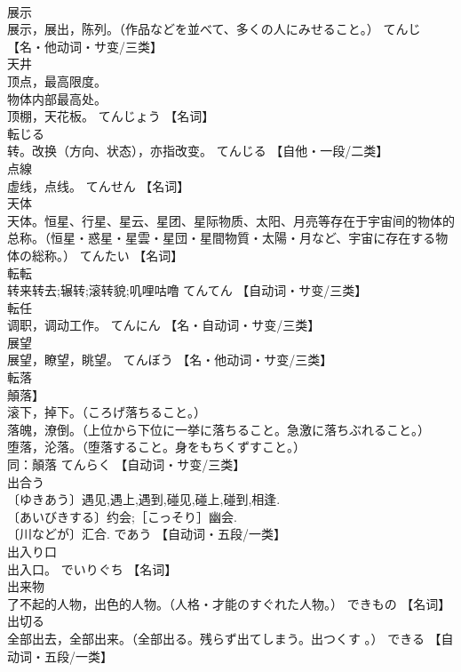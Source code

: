 \documentclass[8pt]{extreport}
\begin{document}
\begin{CJK}{UTF8}{min}
\\	展示	
\\	展示，展出，陈列。（作品などを並べて、多くの人にみせること。）	てんじ		【名・他动词・サ变/三类】
\\	天井	
\\	顶点，最高限度。 
\\	物体内部最高处。 
\\	顶棚，天花板。	てんじょう		【名词】
\\	転じる	
\\	转。改换（方向、状态），亦指改变。	てんじる		【自他・一段/二类】
\\	点線	
\\	虚线，点线。	てんせん		【名词】
\\	天体	
\\	天体。恒星、行星、星云、星团、星际物质、太阳、月亮等存在于宇宙间的物体的总称。（恒星・惑星・星雲・星団・星間物質・太陽・月など、宇宙に存在する物体の総称。）	てんたい		【名词】
\\	転転	
\\	转来转去;辗转;滚转貌;叽哩咕噜	てんてん		【自动词・サ变/三类】
\\	転任	
\\	调职，调动工作。	てんにん		【名・自动词・サ变/三类】
\\	展望	
\\	展望，瞭望，眺望。	てんぼう		【名・他动词・サ变/三类】
\\	転落	
\\	顛落】 
\\	滚下，掉下。（ころげ落ちること。） 
\\	落魄，潦倒。（上位から下位に一挙に落ちること。急激に落ちぶれること。） 
\\	堕落，沦落。（堕落すること。身をもちくずすこと。） 
\\	同：顛落	てんらく		【自动词・サ变/三类】
\\	出合う	
\\	〔ゆきあう〕遇见,遇上,遇到,碰见,碰上,碰到,相逢. 
\\	〔あいびきする〕约会;［こっそり］幽会. 
\\	〔川などが〕汇合.	であう		【自动词・五段/一类】
\\	出入り口	
\\	出入口。	でいりぐち		【名词】
\\	出来物	
\\	了不起的人物，出色的人物。（人格・才能のすぐれた人物。）	できもの		【名词】
\\	出切る	
\\	全部出去，全部出来。（全部出る。残らず出てしまう。出つくす 。）	できる		【自动词・五段/一类】

\end{CJK}
\end{document}
